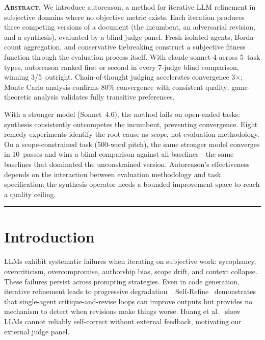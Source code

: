 \documentclass[10pt,twocolumn]{article}
\begin{document}

\noindent\textbf{\scshape Abstract.}\enspace
We introduce autoreason, a method for iterative LLM refinement in subjective domains where no objective metric exists. Each iteration produces three competing versions of a document (the incumbent, an adversarial revision, and a synthesis), evaluated by a blind judge panel. Fresh isolated agents, Borda count aggregation, and conservative tiebreaking construct a subjective fitness function through the evaluation process itself. With claude-sonnet-4 across 5~task types, autoreason ranked first or second in every 7-judge blind comparison, winning 3/5~outright. Chain-of-thought judging accelerates convergence 3$\times$; Monte Carlo analysis confirms 80\% convergence with consistent quality; game-theoretic analysis validates fully transitive preferences.

With a stronger model (Sonnet~4.6), the method fails on open-ended tasks: synthesis consistently outcompetes the incumbent, preventing convergence. Eight remedy experiments identify the root cause as \textit{scope}, not evaluation methodology. On a scope-constrained task (500-word pitch), the same stronger model converges in 10~passes and wins a blind comparison against all baselines---the same baselines that dominated the unconstrained version. Autoreason's effectiveness depends on the interaction between evaluation methodology and task specification: the synthesis operator needs a bounded improvement space to reach a quality ceiling.

\vspace{6pt}
\hrule
\vspace{6pt}

\section{Introduction}

LLMs exhibit systematic failures when iterating on subjective work: sycophancy, overcriticism, overcompromise, authorship bias, scope drift, and context collapse. These failures persist across prompting strategies. Even in code generation, iterative refinement leads to progressive degradation~\cite{slopcodebench}. Self-Refine~\cite{selfrefine} demonstrates that single-agent critique-and-revise loops can improve outputs but provides no mechanism to detect when revisions make things worse. Huang et al.~\cite{huang2023} show LLMs cannot reliably self-correct without external feedback, motivating our external judge panel.
\end{document}
